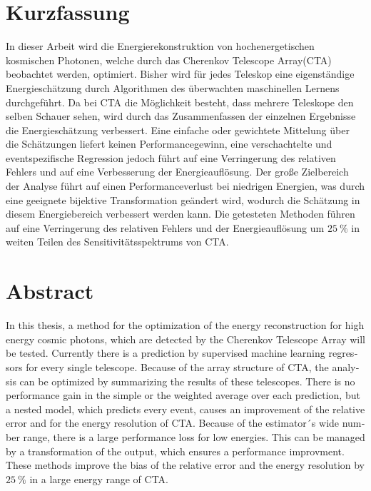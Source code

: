 \thispagestyle{plain}

\section*{Kurzfassung}
In dieser Arbeit wird die Energierekonstruktion von hochenergetischen kosmischen Photonen, welche durch das Cherenkov Telescope Array(CTA) beobachtet
werden, optimiert.
Bisher wird für jedes Teleskop eine eigenständige Energieschätzung durch Algorithmen des überwachten maschinellen Lernens durchgeführt.
Da bei CTA die Möglichkeit besteht, dass mehrere Teleskope den selben Schauer sehen, wird durch das Zusammenfassen der einzelnen Ergebnisse die
Energieschätzung verbessert.
Eine einfache oder gewichtete Mittelung über die Schätzungen liefert keinen Performancegewinn, eine verschachtelte und eventspezifische Regression jedoch
führt auf eine Verringerung des relativen Fehlers und auf eine Verbesserung der Energieauflösung.
Der große Zielbereich der Analyse führt auf einen Performanceverlust bei niedrigen Energien, was durch eine geeignete bijektive Transformation
geändert wird, wodurch die Schätzung in diesem Energiebereich verbessert werden kann.
Die getesteten Methoden führen auf eine Verringerung des relativen Fehlers und der Energieauflösung um $\SI{25}{\percent}$ in weiten Teilen des Sensitivitätsspektrums von CTA.

\section*{Abstract}
\begin{english}
In this thesis, a method for the optimization of the energy reconstruction for high energy cosmic photons, which are detected by the Cherenkov Telescope Array will be tested.
Currently there is a prediction by supervised machine learning regressors for every single telescope.
Because of the array structure of CTA, the analysis can be optimized by summarizing the results of these telescopes.
There is no performance gain in the simple or the weighted average over each prediction, but a nested model, which predicts every event, causes an improvement
of the relative error and for the energy resolution of CTA.
Because of the estimator´s wide number range, there is a large performance loss for low energies.
This can be managed by a transformation of the output, which ensures a performance improvment.
These methods improve the bias of the relative error and the energy resolution by $\SI{25}{\percent}$ in a large energy range of CTA.
\end{english}
